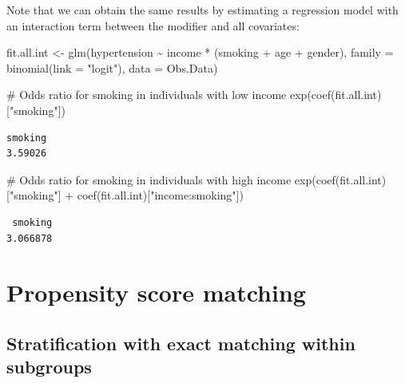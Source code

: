 \documentclass[
  letterpaper,
  DIV=11,
  numbers=noendperiod]{scrreprt}
\newenvironment{Shaded}{\begin{snugshade}}{\end{snugshade}}
\newcommand{\AttributeTok}[1]{\textcolor[rgb]{0.40,0.45,0.13}{#1}}
\newcommand{\CommentTok}[1]{\textcolor[rgb]{0.37,0.37,0.37}{#1}}
\newcommand{\FunctionTok}[1]{\textcolor[rgb]{0.28,0.35,0.67}{#1}}
\newcommand{\NormalTok}[1]{\textcolor[rgb]{0.00,0.23,0.31}{#1}}
\newcommand{\OtherTok}[1]{\textcolor[rgb]{0.00,0.23,0.31}{#1}}
\newcommand{\SpecialCharTok}[1]{\textcolor[rgb]{0.37,0.37,0.37}{#1}}
\newcommand{\StringTok}[1]{\textcolor[rgb]{0.13,0.47,0.30}{#1}}
\begin{document}
Note that we can obtain the same results by estimating a regression
model with an interaction term between the modifier and all covariates:

\begin{Shaded}
\begin{Highlighting}[]
\NormalTok{fit.all.int }\OtherTok{\textless{}{-}} \FunctionTok{glm}\NormalTok{(hypertension }\SpecialCharTok{\textasciitilde{}}\NormalTok{ income }\SpecialCharTok{*}\NormalTok{ (smoking }\SpecialCharTok{+}\NormalTok{ age }\SpecialCharTok{+}\NormalTok{ gender), }
                   \AttributeTok{family =} \FunctionTok{binomial}\NormalTok{(}\AttributeTok{link =} \StringTok{"logit"}\NormalTok{), }\AttributeTok{data =}\NormalTok{ Obs.Data)}

\CommentTok{\# Odds ratio for smoking in individuals with low income }
\FunctionTok{exp}\NormalTok{(}\FunctionTok{coef}\NormalTok{(fit.all.int)[}\StringTok{"smoking"}\NormalTok{])}
\end{Highlighting}
\end{Shaded}

\begin{verbatim}
smoking 
3.59026 
\end{verbatim}

\begin{Shaded}
\begin{Highlighting}[]
\CommentTok{\# Odds ratio for smoking in individuals with high income}
\FunctionTok{exp}\NormalTok{(}\FunctionTok{coef}\NormalTok{(fit.all.int)[}\StringTok{"smoking"}\NormalTok{] }\SpecialCharTok{+} \FunctionTok{coef}\NormalTok{(fit.all.int)[}\StringTok{"income:smoking"}\NormalTok{])}
\end{Highlighting}
\end{Shaded}

\begin{verbatim}
 smoking 
3.066878 
\end{verbatim}

\hypertarget{propensity-score-matching-1}{%
\section{Propensity score matching}\label{propensity-score-matching-1}}

\hypertarget{stratification-with-exact-matching-within-subgroups}{%
\subsection{Stratification with exact matching within
subgroups}\label{stratification-with-exact-matching-within-subgroups}}
\end{document}
